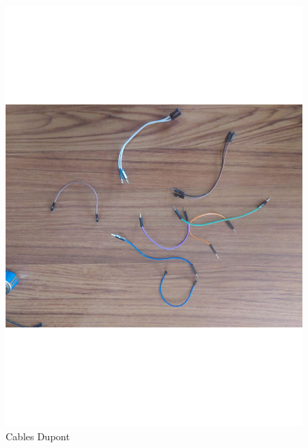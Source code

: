     \begin{figure}[H]
        \centering
        \includegraphics[trim = {30mm 30mm 30mm 30mm},clip,scale=0.2]{10/Img/cablesDupont.pdf}
        \caption{Cables Dupont}
        \label{Cables Dupont}
    \end{figure}
    
